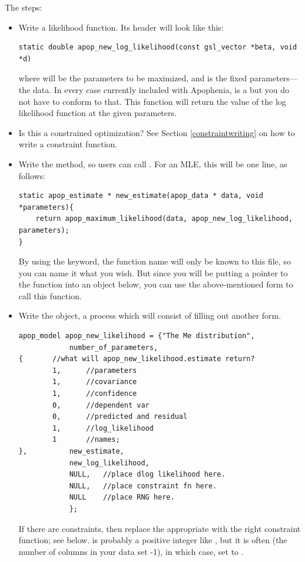 The steps:

\begin{itemize}
\item Write a likelihood function. Its header will look like this:
\begin{lstlisting}
static double apop_new_log_likelihood(const gsl_vector *beta, void *d)
\end{lstlisting}
where  will be the parameters to be maximized, and  is the fixed parameters---the data. In every case currently included
with Apophenia,  is a  but you do not have to conform
to that. This function will return the value of the log likelihood function at the given parameters.

\item Is this a constrained optimization? See Section
\ref{constraintwriting} on how to write a constraint function.

\item Write the  method, so users can call 
. For an MLE, this will be one line,
as follows:
\begin{lstlisting}
static apop_estimate * new_estimate(apop_data * data, void *parameters){
    return apop_maximum_likelihood(data, apop_new_log_likelihood, parameters);
}
\end{lstlisting}
By using the  keyword, the function name will only be
known to this file, so you can name it what you wish.  But since you
will be putting a pointer to the function into an object below, you
can use the above-mentioned 
form to call this function. 


\item Write the object, a process which will consist of filling out
another form. 
\begin{lstlisting}
apop_model apop_new_likelihood = {"The Me distribution", 
            number_of_parameters, 
{       //what will apop_new_likelihood.estimate return?
        1,      //parameters 
        1,      //covariance
        1,      //confidence
        0,      //dependent var
        0,      //predicted and residual
        1,      //log_likelihood
        1       //names;
},          new_estimate,
            new_log_likelihood, 
            NULL,   //place dlog likelihood here.
            NULL,   //place constraint fn here.
            NULL    //place RNG here.
            };
\end{lstlisting}
If there are constraints, then replace the appropriate  with the right constraint function; see below.
 is probably a positive integer like , but
it is often (the number of columns in your data set -1), in which case,
set  to .


\end{itemize}
